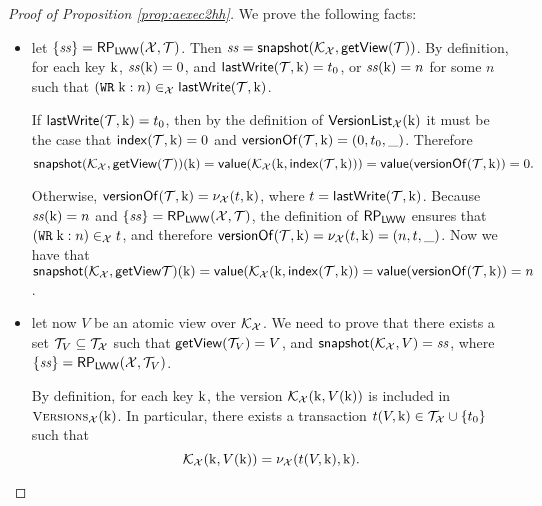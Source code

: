 \begin{proof}[Proof of Proposition \ref{prop:aexec2hh}]
We prove the following facts: 
\begin{itemize}
\item let $\{\mathit{ss}\} = \mathsf{RP}_{\mathsf{LWW}}(\mathcal{X}, \mathcal{T})$. Then $\mathit{ss} = \mathsf{snapshot}(\mathcal{K}_{\mathcal{X}}, \mathsf{getView}(\mathcal{T}))$. 
By definition, for each key $\mathrm{k}$, 
$\mathit{ss}(\mathrm{k}) = 0$, and $\mathsf{lastWrite}(\mathcal{T}, \mathrm{k}) = t_0$, or 
$\mathit{ss}(\mathrm{k}) = n$ for some $n$ such that $({{\tt WR}}\;\mathrm{k}: n) \in_{\mathcal{X}} \mathsf{lastWrite}(\mathcal{T}, \mathrm{k})$. 

If $\mathsf{lastWrite}(\mathcal{T}, \mathrm{k}) = t_0$, then by the definition of $\mathsf{VersionList}_{\mathcal{X}}(\mathrm{k})$ 
it must be the case that $\mathsf{index}(\mathcal{T}, \mathrm{k}) = 0$ and $\mathsf{versionOf}(\mathcal{T}, \mathrm{k}) = (0, t_0, \_)$. 
Therefore 
\[ 
\mathsf{snapshot}(\mathcal{K}_{\mathcal{X}},\mathsf{getView}(\mathcal{T}))(\mathrm{k}) = \mathsf{value}(\mathcal{K}_{\mathcal{X}}(\mathrm{k}, \mathsf{index}(\mathcal{T}, \mathrm{k}))) = 
\mathsf{value}(\mathsf{versionOf}(\mathcal{T}, \mathrm{k})) = 0.
\]

Otherwise, $\mathsf{versionOf}(\mathcal{T}, \mathrm{k}) = \nu_{\mathcal{X}}(t, \mathrm{k})$, 
where $t = \mathsf{lastWrite}(\mathcal{T}, \mathrm{k})$. 
Because $\mathit{ss}(\mathrm{k}) = n$ and $\{\mathit{ss} \} = \mathsf{RP}_{\mathsf{LWW}}(\mathcal{X}, \mathcal{T})$, 
the definition of $\mathsf{RP}_{\mathsf{LWW}}$ ensures that $({{\tt WR}}\;\mathrm{k}: n) \in_{\mathcal{X}} t$, 
and therefore $\mathsf{versionOf}(\mathcal{T}, \mathrm{k}) = \nu_{\mathcal{X}}(t, \mathrm{k}) = (n, t, \_)$. 
Now we have that $\mathsf{snapshot}(\mathcal{K}_{\mathcal{X}}, \mathsf{getView}{\mathcal{T}})(\mathrm{k}) = 
\mathsf{value}(\mathcal{K}_{\mathcal{X}}(\mathrm{k}, \mathsf{index}(\mathcal{T}, \mathrm{k})) = \mathsf{value}(\mathsf{versionOf}(\mathcal{T}, \mathrm{k})) = n$.

\item let now $V$ be an atomic view over $\mathcal{K}_{\mathcal{X}}$. We need to prove that there exists 
a set $\mathcal{T}_{V} \subseteq \mathcal{T}_{\mathcal{X}}$ such that $\mathsf{getView}(\mathcal{T}_{V}) = V$, and  
$\mathsf{snapshot}(\mathcal{K}_{\mathcal{X}}, V) = \mathit{ss}$, 
where $\{\mathit{ss}\} = \mathsf{RP}_{\mathsf{LWW}}(\mathcal{X}, \mathcal{T}_{V})$. 

By definition, for each key $\mathrm{k}$, the version $\mathcal{K}_{\mathcal{X}}(\mathrm{k}, V(\mathrm{k}))$ 
is included in $\Versions_{\aexec}(\key{k})$. 
In particular,  there exists a transaction $t(V, \mathrm{k}) \in \mathcal{T}_{\mathcal{X}} \cup \{t_0\}$ 
such that 
\[
\mathcal{K}_{\mathcal{X}}(\mathrm{k}, V(\mathrm{k})) = \nu_{\mathcal{X}}( t({V}, \mathrm{k}), \mathrm{k}).
\]


\end{itemize}
\end{proof}
